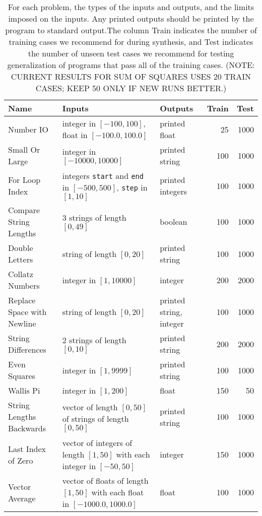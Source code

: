 \documentclass{sig-alternate}
\begin{document}
\begin{table*}[t]
\centering
\caption{For each problem, the types of the inputs and outputs, and the limits imposed on the inputs. Any printed outputs should be printed by the program to standard output.The column Train indicates the number of training cases we recommend for during synthesis, and Test indicates the number of unseen test cases we recommend for testing generalization of programs that pass all of the training cases. (NOTE: CURRENT RESULTS FOR SUM OF SQUARES USES 20 TRAIN CASES; KEEP 50 ONLY IF NEW RUNS BETTER.)}
\label{testCasesTable}
\begin{tabular}{|l | >{\raggedright}p{7.4cm} l rr|}
\hline
\textbf{Name} & \textbf{Inputs} & \textbf{Outputs} & \textbf{Train} & \textbf{Test} \\
\hline
\hline
Number IO & integer in $[-100, 100]$, float in $[-100.0, 100.0]$ & printed float & 25 & 1000 \\
\hline
Small Or Large & integer in $[-10000, 10000]$ & printed string & 100 & 1000 \\
\hline
For Loop Index & integers \texttt{start} and \texttt{end} in $[-500, 500]$, \texttt{step} in $[1, 10]$ & printed integers & 100 & 1000 \\
\hline
Compare String Lengths & 3 strings of length $[0, 49]$ & boolean & 100 & 1000 \\
\hline
Double Letters & string of length $[0, 20]$ & printed string & 100 & 1000 \\
\hline
Collatz Numbers & integer in $[1, 10000]$ & integer & 200 & 2000 \\
\hline
Replace Space with Newline & string of length $[0, 20]$ & printed string, integer & 100 & 1000 \\
\hline
String Differences & 2 strings of length $[0, 10]$ & printed string & 200 & 2000 \\
\hline
Even Squares & integer in $[1, 9999]$ & printed string & 100 & 1000 \\
\hline
Wallis Pi & integer in $[1, 200]$ & float & 150 & 50 \\
\hline
String Lengths Backwards & vector of length $[0, 50]$ of strings of length $[0, 50]$ & printed string & 100 & 1000 \\
\hline
Last Index of Zero & vector of integers of length $[1, 50]$ with each integer in $[-50, 50]$ & integer & 150 & 1000 \\
\hline
Vector Average & vector of floats of length $[1,50]$ with each float in $[-1000.0, 1000.0]$ & float & 100 & 1000 \\

\end{tabular}
\end{table*}
\end{document}
